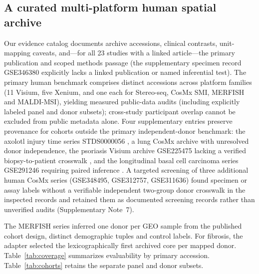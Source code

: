\documentclass[11pt]{article}
\begin{document}
\subsection{A curated multi-platform human spatial archive}
Our evidence catalog documents archive accessions, clinical contrasts, unit-mapping caveats, and---for all 23 studies with a linked article---the primary publication and scoped methods passage (the supplementary specimen record GSE346380 explicitly lacks a linked publication or named inferential test). The primary human benchmark comprises \ArchiveCount{} distinct accessions across \MeasuredPlatforms{} platform families (11 Visium, five Xenium, and one each for Stereo-seq, CosMx SMI, MERFISH and MALDI-MSI), yielding \PublicRuns{} measured public-data audits (including explicitly labeled panel and donor subsets); cross-study participant overlap cannot be excluded from public metadata alone. Four supplementary entries preserve provenance for cohorts outside the primary independent-donor benchmark: the axolotl injury time series STDS0000056 \cite{axolotl}, a lung CosMx archive with unresolved donor independence, the psoriasis Visium archive GSE225475 lacking a verified biopsy-to-patient crosswalk \cite{geo225475}, and the longitudinal basal cell carcinoma series GSE291246 requiring paired inference \cite{geo291246}. A targeted screening of three additional human CosMx series (GSE348495, GSE312757, GSE311636) found specimen or assay labels without a verifiable independent two-group donor crosswalk in the inspected records and retained them as documented screening records rather than unverified audits (Supplementary Note~7).

The MERFISH series inferred one donor per GEO sample from the published cohort design, distinct demographic tuples and control labels. For fibrosis, the adapter selected the lexicographically first archived core per mapped donor. Table~\ref{tab:coverage} summarizes evaluability by primary accession. Table~\ref{tab:cohorts} retains the separate panel and donor subsets.
\end{document}
